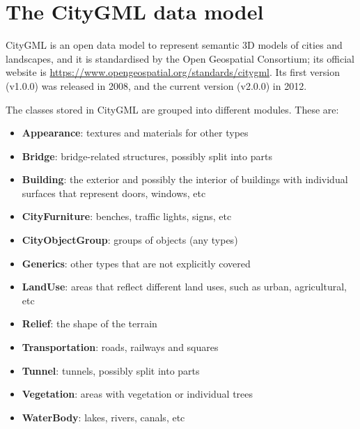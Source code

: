 %
\section{The CityGML data model}

CityGML is an open data model to represent semantic 3D models of cities and landscapes, and it is standardised by the Open Geospatial Consortium; its official website is \url{https://www.opengeospatial.org/standards/citygml}.
Its first version (v1.0.0) was released in 2008, and the current version (v2.0.0) in 2012.

The classes stored in CityGML are grouped into different modules. These are:
\begin{itemize}
  \item \textbf{Appearance}: textures and materials for other types
  \item \textbf{Bridge}: bridge-related structures, possibly split into parts
  \item \textbf{Building}: the exterior and possibly the interior of buildings with individual surfaces that represent doors, windows, etc
  \item \textbf{CityFurniture}: benches, traffic lights, signs, etc
  \item \textbf{CityObjectGroup}: groups of objects (any types) 
  \item \textbf{Generics}: other types that are not explicitly covered
  \item \textbf{LandUse}: areas that reflect different land uses, such as urban, agricultural, etc
  \item \textbf{Relief}: the shape of the terrain
  \item \textbf{Transportation}: roads, railways and squares
  \item \textbf{Tunnel}: tunnels, possibly split into parts
  \item \textbf{Vegetation}: areas with vegetation or individual trees
  \item \textbf{WaterBody}: lakes, rivers, canals, etc
\end{itemize}

%


